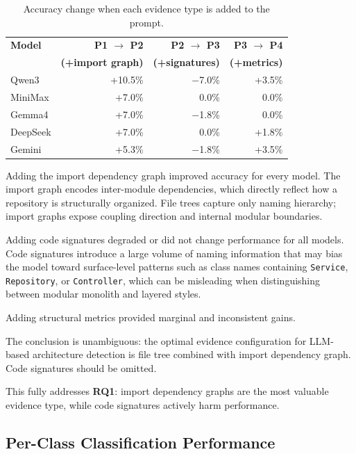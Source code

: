 \begin{table}[H]
\centering
\small
\caption{Accuracy change when each evidence type is added to the prompt.}
\label{tab:eval_evidence_delta}
\begin{tabular}{lrrr}
\toprule
\textbf{Model} & \textbf{P1 $\to$ P2} & \textbf{P2 $\to$ P3} & \textbf{P3 $\to$ P4} \\
 & \textbf{(+import graph)} & \textbf{(+signatures)} & \textbf{(+metrics)} \\
\midrule
Qwen3    & +10.5\% & $-$7.0\% & +3.5\% \\
MiniMax  & +7.0\%  &  0.0\%  &  0.0\% \\
Gemma4   & +7.0\%  & $-$1.8\% &  0.0\% \\
DeepSeek & +7.0\%  &  0.0\%  & +1.8\% \\
Gemini   & +5.3\%  & $-$1.8\% & +3.5\% \\
\bottomrule
\end{tabular}
\end{table}

Adding the import dependency graph improved accuracy for every model. The import graph encodes inter-module dependencies, which directly reflect how a repository is structurally organized. File trees capture only naming hierarchy; import graphs expose coupling direction and internal modular boundaries.

Adding code signatures degraded or did not change performance for all models. Code signatures introduce a large volume of naming information that may bias the model toward surface-level patterns such as class names containing \texttt{Service}, \texttt{Repository}, or \texttt{Controller}, which can be misleading when distinguishing between modular monolith and layered styles.

Adding structural metrics provided marginal and inconsistent gains.

The conclusion is unambiguous: the optimal evidence configuration for LLM-based architecture detection is file tree combined with import dependency graph. Code signatures should be omitted.

This fully addresses \textbf{RQ1}: import dependency graphs are the most valuable evidence type, while code signatures actively harm performance.

\subsection{Per-Class Classification Performance}
\label{subsec:eval_per_class}

